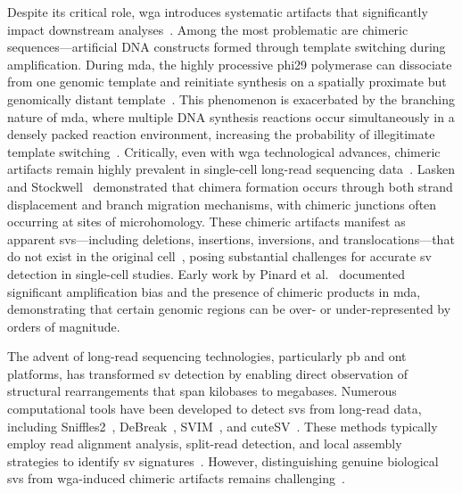 \documentclass[pdflatex,sn-nature,lineno]{sn-jnl}%
\theoremstyle{thmstyleone}%
\theoremstyle{thmstyletwo}%
\theoremstyle{thmstylethree}%
\begin{document}
Despite its critical role, \gls{wga} introduces systematic artifacts that significantly impact downstream analyses~\cite{lu2023chimera,lu2023exploration, pinard2006assessment,lasken2007mechanism,chen2017singlecell}.
Among the most problematic are chimeric sequences—artificial DNA constructs formed through template switching during amplification.
During \gls{mda}, the highly processive phi29 polymerase can dissociate from one genomic template and reinitiate synthesis on a spatially proximate but genomically distant template~\cite{lasken2007mechanism,lu2023chimera}.
This phenomenon is exacerbated by the branching nature of \gls{mda}, where multiple DNA synthesis reactions occur simultaneously in a densely packed reaction environment, increasing the probability of illegitimate template switching~\cite{lasken2007mechanism}.
Critically, even with \gls{wga} technological advances, chimeric artifacts remain highly prevalent in single-cell long-read sequencing data~\cite{hard2023longread,dippenaar2024droplet,gonzalez-pena2021accurate}.
Lasken and Stockwell~\cite{lasken2007mechanism} demonstrated that chimera formation occurs through both strand displacement and branch migration mechanisms, with chimeric junctions often occurring at sites of microhomology.
These chimeric artifacts manifest as apparent \glspl{sv}—including deletions, insertions, inversions, and translocations—that do not exist in the original cell~\cite{lu2023chimera,agyabeng2025evaluating}, posing substantial challenges for accurate \gls{sv} detection in single-cell studies.
Early work by Pinard et al.~\cite{pinard2006assessment} documented significant amplification bias and the presence of chimeric products in \gls{mda}, demonstrating that certain genomic regions can be over- or under-represented by orders of magnitude.

The advent of long-read sequencing technologies, particularly \gls{pb} and \gls{ont} platforms, has transformed \gls{sv} detection by enabling direct observation of structural rearrangements that span kilobases to megabases.
Numerous computational tools have been developed to detect \glspl{sv} from long-read data, including
Sniffles2~\cite{Sedlazeck2018,Smolka2024}, DeBreak~\cite{chen2023deciphering}, SVIM~\cite{heller2019svim}, and cuteSV~\cite{jiang2020longreadbased}.
These methods typically employ read alignment analysis, split-read detection, and local assembly strategies to identify \gls{sv} signatures~\cite{alkan2011genome}.
However, distinguishing genuine biological \glspl{sv} from \gls{wga}-induced chimeric artifacts remains challenging~\cite{kiguchi2021longread,lu2023exploration,kosugi2019comprehensive,mahmoud2019structural}.
\end{document}
